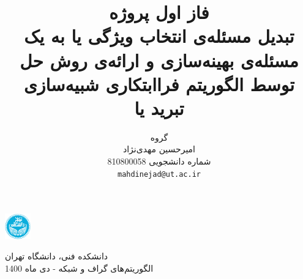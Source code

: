 \documentclass{article}
\title{
فاز اول پروژه\\
تبدیل مسئله‌ی انتخاب ویژگی یا
\lr{Feature selection}
به یک مسئله‌ی بهینه‌سازی و ارائه‌ی روش حل توسط الگوریتم فراابتکاری شبیه‌سازی تبرید یا
\lr{Simulated annealing}
}
\author{%
    گروه \lr{B}\\
  امیرحسین مهدی‌نژاد\\
  شماره دانشجویی 810800058\\
  \texttt{mahdinejad@ut.ac.ir} \\
}
\begin{document}
\begin{minipage}{0.1\textwidth}%
\includegraphics[width=1.1cm]{Photos/UT_logo.png}
\end{minipage}%
\hfill%
\begin{minipage}{0.9\textwidth}\raggedleft
دانشکده فنی، دانشگاه تهران\\
الگوریتم‌های گراف و شبکه - 
دی
ماه 1400\\
\end{minipage}


\makepertitle


\end{document}
